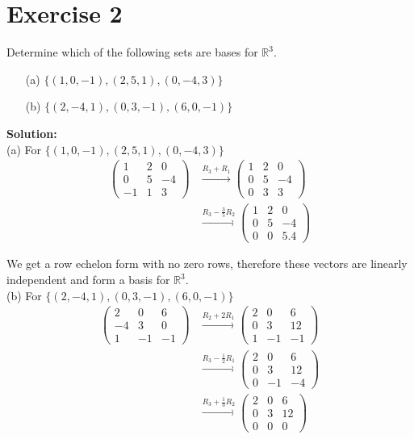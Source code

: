 \documentclass{article}
\begin{document}
\newpage

\section*{Exercise 2}
Determine which of the following sets are bases for $\mathbb{R}^3$.
\begin{itemize}
\item[(a)] $\{(1,0,-1),(2,5,1),(0,-4,3)\}$
\item[(b)] $\{(2,-4,1),(0,3,-1),(6,0,-1)\}$
\end{itemize}

\textbf{Solution:} \\

(a) For $\{(1,0,-1),(2,5,1),(0,-4,3)\}$
\begin{align*}
\begin{pmatrix}
1 & 2 & 0 \\
0 & 5 & -4 \\
-1 & 1 & 3
\end{pmatrix} &\xrightarrow{R_3 + R_1} 
\begin{pmatrix}
1 & 2 & 0 \\
0 & 5 & -4 \\
0 & 3 & 3
\end{pmatrix} \\
&\xrightarrow{R_3 - \frac{3}{5}R_2}
\begin{pmatrix}
1 & 2 & 0 \\
0 & 5 & -4 \\
0 & 0 & 5.4
\end{pmatrix}
\end{align*}

We get a row echelon form with no zero rows, therefore these vectors are linearly independent and form a basis for $\mathbb{R}^3$. \\

(b) For $\{(2,-4,1),(0,3,-1),(6,0,-1)\}$
\begin{align*}
\begin{pmatrix}
2 & 0 & 6 \\
-4 & 3 & 0 \\
1 & -1 & -1
\end{pmatrix} &\xrightarrow{R_2 + 2R_1}
\begin{pmatrix}
2 & 0 & 6 \\
0 & 3 & 12 \\
1 & -1 & -1
\end{pmatrix} \\
&\xrightarrow{R_3 - \frac{1}{2}R_1}
\begin{pmatrix}
2 & 0 & 6 \\
0 & 3 & 12 \\
0 & -1 & -4
\end{pmatrix} \\
&\xrightarrow{R_3 + \frac{1}{3}R_2}
\begin{pmatrix}
2 & 0 & 6 \\
0 & 3 & 12 \\
0 & 0 & 0
\end{pmatrix}
\end{align*}
\end{document}
